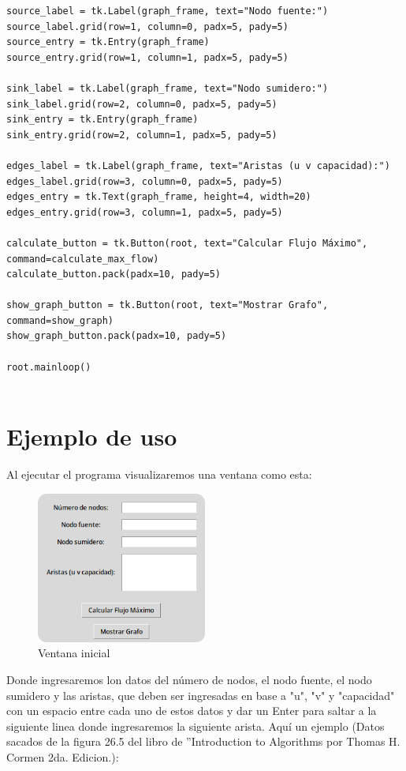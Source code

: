 \documentclass[a4paper]{article}
\begin{document}
\begin{lstlisting}[style=mystyle, caption={Código de la implemntación de la interfaz gráfica}, label={lst:edmonds-karp}]
source_label = tk.Label(graph_frame, text="Nodo fuente:")
source_label.grid(row=1, column=0, padx=5, pady=5)
source_entry = tk.Entry(graph_frame)
source_entry.grid(row=1, column=1, padx=5, pady=5)

sink_label = tk.Label(graph_frame, text="Nodo sumidero:")
sink_label.grid(row=2, column=0, padx=5, pady=5)
sink_entry = tk.Entry(graph_frame)
sink_entry.grid(row=2, column=1, padx=5, pady=5)

edges_label = tk.Label(graph_frame, text="Aristas (u v capacidad):")
edges_label.grid(row=3, column=0, padx=5, pady=5)
edges_entry = tk.Text(graph_frame, height=4, width=20)
edges_entry.grid(row=3, column=1, padx=5, pady=5)

calculate_button = tk.Button(root, text="Calcular Flujo Máximo", command=calculate_max_flow)
calculate_button.pack(padx=10, pady=5)

show_graph_button = tk.Button(root, text="Mostrar Grafo", command=show_graph)
show_graph_button.pack(padx=10, pady=5)

root.mainloop()


\end{lstlisting}

\newpage
\section{Ejemplo de uso}
Al ejecutar el programa visualizaremos una ventana como esta:
\begin{figure}[H]
    \centering
    \includegraphics[width=0.5\textwidth]{1.png}
    \caption{Ventana inicial}
\end{figure}
Donde ingresaremos lon datos del número de nodos, el nodo fuente, el nodo sumidero y las aristas, que deben ser ingresadas en base a "u", "v" y "capacidad" con un espacio entre cada uno de estos datos y dar un Enter para saltar a la siguiente linea donde ingresaremos la siguiente arista.
Aquí un ejemplo (Datos sacados de la figura  26.5 del libro de ”Introduction to Algorithms por Thomas H. Cormen 2da. Edicion.):
\end{document}
